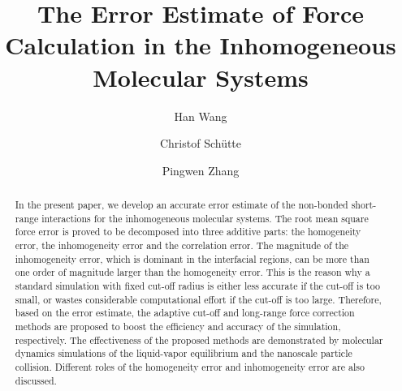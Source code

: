 \documentclass[preprint]{revtex4}
\begin{document}
\title{The Error Estimate of Force Calculation in the Inhomogeneous Molecular Systems}
\author{Han Wang}
\author{Christof Sch\"utte}
\author{Pingwen Zhang}

\begin{abstract}
  {
    In the present paper, we develop an accurate error estimate of the
    non-bonded short-range interactions for the inhomogeneous molecular
    systems.
    The root mean square force error is proved to be decomposed into
    three additive parts: the homogeneity error, the inhomogeneity error
    and the correlation error.
    The magnitude of the inhomogeneity error, which
    is dominant in the interfacial regions, 
    can be more than one order of magnitude larger than the homogeneity
    error.
    This is the reason why a standard simulation with fixed
    cut-off radius is either less accurate if the cut-off is too small,
    or wastes considerable computational effort if the cut-off is too large.
    Therefore, based on the error estimate, the adaptive cut-off
    and long-range force correction methods are proposed to
    boost the efficiency and accuracy of the simulation, respectively.
    The
    effectiveness of the proposed methods are demonstrated by
    molecular dynamics 
    simulations of the liquid-vapor equilibrium and the nanoscale particle
    collision. Different roles of the homogeneity error and inhomogeneity
    error are also discussed.
  }
\end{abstract}

\maketitle
\end{document}

